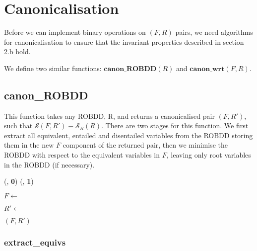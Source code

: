 \documentclass[11pt,table]{article}
\newcounter{r}
\newcommand{\semR}[1]{\mathcal{S}_R(#1)}
\newcommand{\semFR}[1]{\mathcal{S}(#1)}
\newcommand{\func}[2]{\mathbf{#1}(#2)}
\begin{document}
\section{Canonicalisation}

Before we can implement binary operations on $ (F,R) $ pairs, we need algorithms for canonicalisation to ensure that the invariant properties described in section 2.b hold.

We define two similar functions: $ \func{canon\_ROBDD}{R} $ and $ \func{canon\_wrt}{F,R} $.

\subsection{canon\_ROBDD}

This function takes any ROBDD, R, and returns a canonicalised pair $ (F,R') $, such that $ \semFR{F,R'} \equiv \semR{R} $.
There are two stages for this function. We first extract all equivalent, entailed and disentailed variables from the ROBDD storing them in the new $ F $ component of the returned pair, then we minimise the ROBDD with respect to the equivalent variables in $ F $, leaving only root variables in the ROBDD (if necessary).

\begin{algorithm}
	\begin{algorithmic}[1]
				\Return (, \textbf{0})
			\Else{}
				\Return (, \textbf{1})
			\EndIf
		\Else	
		
			\State $ F \gets  $ 
			
			\State $ R' \gets $ 
			
			\State \Return $ (F,R') $

		\EndIf
		\EndFunction
	\end{algorithmic}
\end{algorithm}


\subsubsection{extract\_equivs}
\end{document}
